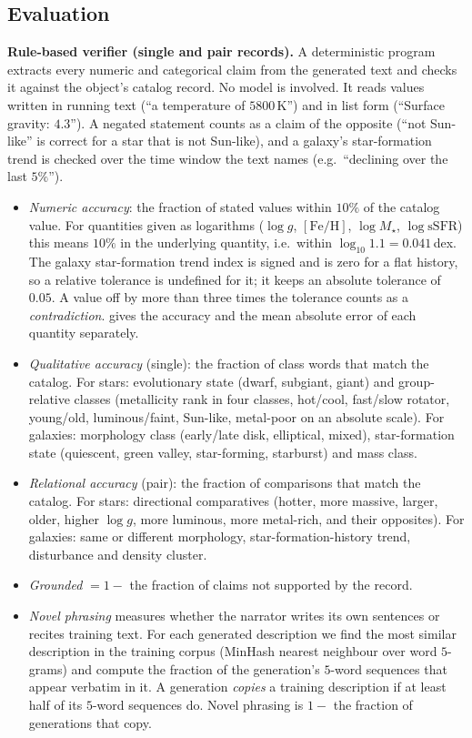 \subsection{Evaluation}\label{app:eval}
\textbf{Rule-based verifier (single and pair records).} A deterministic program
extracts every numeric and categorical claim from the generated text and checks
it against the object's catalog record. No model is involved. It reads values
written in running text (``a temperature of $5800$\,K'') and in list form
(``Surface gravity: $4.3$''). A negated statement counts as a claim of the
opposite (``not Sun-like'' is correct for a star that is not Sun-like), and a
galaxy's star-formation trend is checked over the time window the text names
(e.g.\ ``declining over the last $5\%$'').
\begin{itemize}\itemsep1pt
\item \emph{Numeric accuracy}: the fraction of stated values within $10\%$ of
  the catalog value. For quantities given as logarithms ($\log g$, $[\mathrm{Fe/H}]$,
  $\log M_\star$, $\log \mathrm{sSFR}$) this means $10\%$ in the underlying
  quantity, i.e.\ within $\log_{10} 1.1 = 0.041$\,dex. The galaxy
  star-formation trend index is signed and is zero for a flat history, so a
  relative tolerance is undefined for it; it keeps an absolute tolerance of
  $0.05$. A value off by more than three times the tolerance counts as a
  \emph{contradiction}.  gives the accuracy and the mean absolute
  error of each quantity separately.
\item \emph{Qualitative accuracy} (single): the fraction of class words that
  match the catalog. For stars: evolutionary state (dwarf, subgiant, giant) and
  group-relative classes (metallicity rank in four classes, hot/cool, fast/slow
  rotator, young/old, luminous/faint, Sun-like, metal-poor on an absolute scale). For galaxies: morphology class (early/late disk,
  elliptical, mixed), star-formation state (quiescent, green valley,
  star-forming, starburst) and mass class.
\item \emph{Relational accuracy} (pair): the fraction of comparisons that match the
  catalog. For stars: directional comparatives (hotter, more massive, larger,
  older, higher $\log g$, more luminous, more metal-rich, and their opposites).
  For galaxies: same or different morphology, star-formation-history trend,
  disturbance and density cluster.
\item \emph{Grounded} $=1-$ the fraction of claims not supported by the record.
\item \emph{Novel phrasing} measures whether the narrator writes its own
  sentences or recites training text. For each generated description we find
  the most similar description in the training corpus (MinHash nearest
  neighbour over word $5$-grams) and compute the fraction of the generation's
  $5$-word sequences that appear verbatim in it. A generation \emph{copies} a
  training description if at least half of its $5$-word sequences do. Novel
  phrasing is $1-$ the fraction of generations that copy.
\end{itemize}

